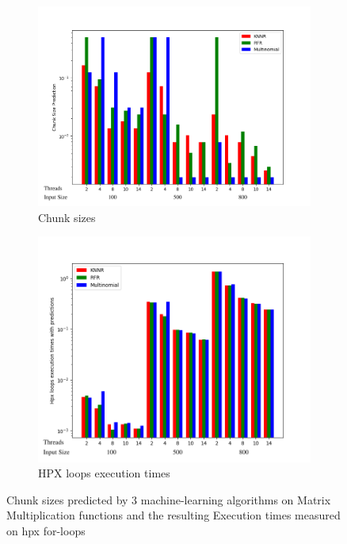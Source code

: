 \begin{figure}[h]
	\centering
	\begin{subfigure}[b]{0.515\textwidth}
		\centering
		\includegraphics[width=\textwidth]{images/matrix_mult_prediction_bars.png}
		\caption[Network2]%
		{{Chunk sizes}}    
	\end{subfigure}
	\hfill
	\begin{subfigure}[b]{0.475\textwidth}  
		\centering 
		\includegraphics[width=\textwidth]{images/matrix_mult_times_bars.png}
		\caption[]%
		{{HPX loops execution times}}    
	\end{subfigure}
	\caption{Chunk sizes predicted by 3 machine-learning algorithms on Matrix Multiplication functions and the resulting Execution times measured on hpx for-loops} 
	
\end{figure}



